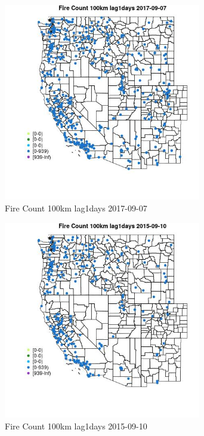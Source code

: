 \begin{figure} 
\centering  
\includegraphics[width=0.77\textwidth]{Code_Outputs/Report_ML_input_PM25_Step4_part_e_de_duplicated_aves_compiled_2019-05-20wNAs_MapObsFire_Count_100km_lag1days2017-09-07.jpg} 
\caption{\label{fig:Report_ML_input_PM25_Step4_part_e_de_duplicated_aves_compiled_2019-05-20wNAsMapObsFire_Count_100km_lag1days2017-09-07}Fire Count 100km lag1days 2017-09-07} 
\end{figure} 
 

\begin{figure} 
\centering  
\includegraphics[width=0.77\textwidth]{Code_Outputs/Report_ML_input_PM25_Step4_part_e_de_duplicated_aves_compiled_2019-05-20wNAs_MapObsFire_Count_100km_lag1days2015-09-10.jpg} 
\caption{\label{fig:Report_ML_input_PM25_Step4_part_e_de_duplicated_aves_compiled_2019-05-20wNAsMapObsFire_Count_100km_lag1days2015-09-10}Fire Count 100km lag1days 2015-09-10} 
\end{figure} 
 

